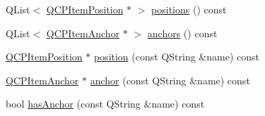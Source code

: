 \begin{DoxyCompactItemize}
\item 
Q\+List$<$ \mbox{\hyperlink{class_q_c_p_item_position}{Q\+C\+P\+Item\+Position}} $\ast$ $>$ \mbox{\hyperlink{class_q_c_p_abstract_item_a709f655ac3f7f22d452714134662b454}{positions}} () const
\item 
Q\+List$<$ \mbox{\hyperlink{class_q_c_p_item_anchor}{Q\+C\+P\+Item\+Anchor}} $\ast$ $>$ \mbox{\hyperlink{class_q_c_p_abstract_item_a81d1ecfea3368b836cf9675a0045e659}{anchors}} () const
\item 
\mbox{\hyperlink{class_q_c_p_item_position}{Q\+C\+P\+Item\+Position}} $\ast$ \mbox{\hyperlink{class_q_c_p_abstract_item_a2589c3d298f9a576d77d9addb440a18d}{position}} (const Q\+String \&name) const
\item 
\mbox{\hyperlink{class_q_c_p_item_anchor}{Q\+C\+P\+Item\+Anchor}} $\ast$ \mbox{\hyperlink{class_q_c_p_abstract_item_a139c255ea8831642fac91748e29a5adb}{anchor}} (const Q\+String \&name) const
\item 
bool \mbox{\hyperlink{class_q_c_p_abstract_item_a84914f4516f9b38ef0bd89eafe3dbda7}{has\+Anchor}} (const Q\+String \&name) const
\end{DoxyCompactItemize}
